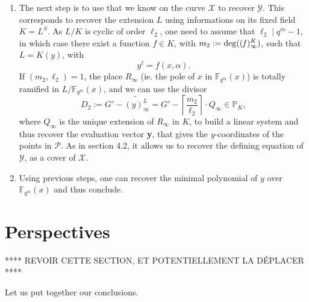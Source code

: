 \documentclass[10pt]{article}
\newcommand{\s}{\vspace{0.3cm}}
\newcommand{\cd}{\cdot}
\newcommand{\fqm}{\mathbb{F}_{q^m}}
\newcommand{\X}{\mathcal{X}}
\newcommand{\Y}{\mathcal{Y}}
\newcommand{\PR}{\mathcal{P}}
\begin{document}
\begin{enumerate}
\item The next step is to use that we know on the curve $\X$ to recover $\Y$. This corresponds to recover the extension $L$ using informations on its fixed field $K=L^S$. As $L/K$ is cyclic of order $\ell_2$, one need to assume that $\ell_2 \mid q^m-1$, in which case there exist a function $f \in K$, with $m_2:= \rm{deg}\it ((f)^K_{\infty})$, such that $L=K(y)$, with
\[y^{\ell} = f(x,\alpha).\]   
If $(m_2,\ell_2)=1$, the place $R_{\infty}$ (ie. the pole of $x$ in $\fqm(x)$) is totally ramified in $L/\fqm(x)$, and we can use the divisor 
\[D_2 := G' - \widetilde{(y)^L_{\infty}} = G' - \left\lceil\frac{m_2}{\ell_2}\right\rceil \cd Q_{\infty} \in \mathbb{P}_{K},\]
where $Q_{\infty}$ is the unique extension of $R_{\infty}$ in $K$, to build a linear system and thus recover the evaluation vector \textbf{y}, that gives the $y$-coordinates of the points in $\PR$. As in section 4.2, it allows us to recover the defining equation of $\Y$, as a cover of $\X$.

\item Using previous steps, one can recover the minimal polynomial of $y$ over $\fqm(x)$ and thus conclude.
\end{enumerate}

\s

\section{Perspectives}

\s

**** REVOIR CETTE SECTION, ET POTENTIELLEMENT LA DÉPLACER ****

\s

Let us put together our conclusions.
\end{document}
